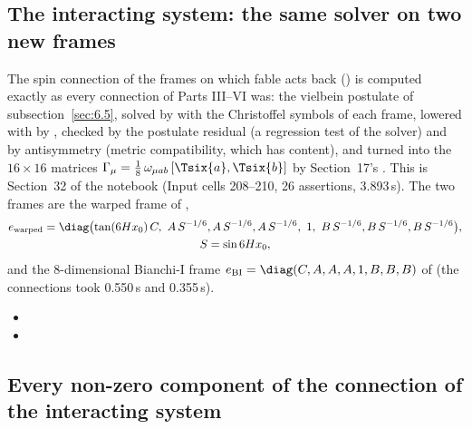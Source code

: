 \subsection{The interacting system: the same solver on two new frames}
\label{sec:6.14}

The spin connection of the frames on which fable acts back () is computed exactly as
every connection of Parts III--VI was: the vielbein postulate of subsection~\ref{sec:6.5}, solved by
 with the Christoffel symbols of each frame, lowered with  by
, checked by the postulate residual (a regression test of the solver) and by
antisymmetry (metric compatibility, which has content), and turned into the $16\times16$ matrices
$\Gamma_\mu=\tfrac18\,\omega_{\mu ab}\,[\Tsix{a},\Tsix{b}]$ by Section~17's 
. This is Section~32 of the notebook (Input cells 208--210, 26 assertions,
3.893\,s). The two frames are the warped frame of ,
\begin{gather*}
  e_{\mathrm{warped}}=\diag\bigl(\tan(6Hx_0)\,C,\ A\,S^{-1/6},A\,S^{-1/6},A\,S^{-1/6},\ 1,\ B\,S^{-1/6},B\,S^{-1/6},B\,S^{-1/6}\bigr),\\
  S=\sin 6Hx_0 ,
\end{gather*}
and the 8-dimensional Bianchi-I frame $e_{\mathrm{BI}}=\diag(C,A,A,A,1,B,B,B)$ of  (the
connections took 0.550\,s and 0.355\,s). 
\begin{itemize}
  \item {}
  \item {}
\end{itemize}

\subsection{Every non-zero component of the connection of the interacting system}
\label{sec:6.15}

